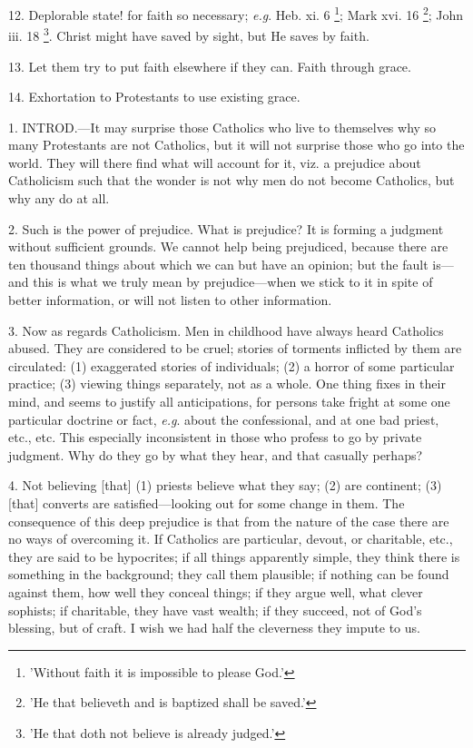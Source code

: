 12. Deplorable state! for faith so necessary; \emph{e.g}.
Heb. xi. 6 \footnote{'Without faith it is
impossible to please God.'}; Mark xvi.
16 \footnote{'He that believeth and
is baptized shall be saved.'}; John iii. 18 \footnote{'He that doth not
believe is already judged.'}. Christ might have saved by sight, but He saves by faith.

13. Let them try to put faith elsewhere if they
can. Faith through grace.

14. Exhortation to Protestants to use existing
grace.


1. INTROD.—It
may surprise those Catholics who live to themselves why so many
Protestants are not Catholics, but it will not surprise those who go
into the world. They will there find what will account for it, viz. a
prejudice about Catholicism such that the wonder is not why men do not
become Catholics, but why any do at all.

2. Such is the power of prejudice. What is
prejudice? It is forming a judgment without sufficient grounds. We
cannot help being prejudiced, because there are ten thousand things
about which we can but have an opinion; but the fault is—and this is
what we truly mean by prejudice—when we stick to it in spite of
better information, or will not listen to other information.

3. Now as regards Catholicism. Men in childhood
have always heard Catholics abused. They are considered to be
cruel; stories of torments inflicted by them are circulated: (1)
exaggerated stories of individuals; (2) a horror of some particular
practice; (3) viewing things separately, not as a whole. One thing
fixes in their mind, and seems to justify all anticipations, for
persons take fright at some one particular doctrine or fact, \emph{e.g}.
about the confessional, and at one bad priest, etc., etc. This
especially inconsistent in those who profess to go by private
judgment. Why do they go by what they hear, and that casually perhaps?

4. Not believing [that] (1) priests believe what
they say; (2) are continent; (3) [that] converts are
satisfied—looking out for some change in them. The consequence of
this deep prejudice is that from the nature of the case there are no
ways of overcoming it. If Catholics are particular, devout, or
charitable, etc., they are said to be hypocrites; if all things
apparently simple, they think there is something in the background;
they call them plausible; if nothing can be found against them, how
well they conceal things; if they argue well, what clever sophists; if
charitable, they have vast wealth; if they succeed, not of God's
blessing, but of craft. I wish we had half the cleverness they impute
to us.

